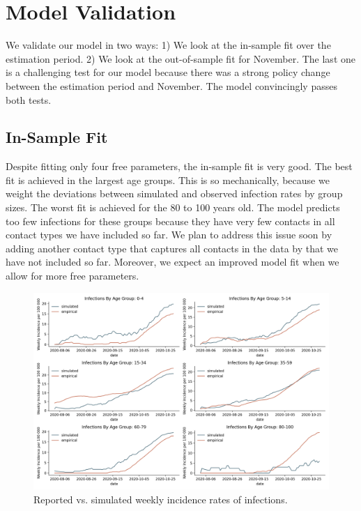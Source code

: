 \section{Model Validation}
\label{sec:model_validation}

We validate our model in two ways: 1) We look at the in-sample fit over the estimation
period. 2) We look at the out-of-sample fit for November. The last one is a challenging
test for our model because there was a strong policy change between the estimation
period and November. The model convincingly passes both tests.


\subsection{In-Sample Fit}

Despite fitting only four free parameters, the in-sample fit is very good. The best fit
is achieved in the largest age groups. This is so mechanically, because we weight the
deviations between simulated and observed infection rates by group sizes. The worst fit
is achieved for the 80 to 100 years old. The model predicts too few infections for these
groups because they have very few contacts in all contact types we have included so far.
We plan to address this issue soon by adding another contact type that captures all
contacts in the data by \citet{Mossong2008} that we have not included so far. Moreover,
we expect an improved model fit when we allow for more free parameters.


\begin{figure}[!tp]
    \centering
    \includegraphics[width=\textwidth]{../figures/goodness_of_fit_by_age_group}
    \caption{Reported vs. simulated weekly incidence rates of infections.}
    \label{fig:goodness_of_fit}
\end{figure}


